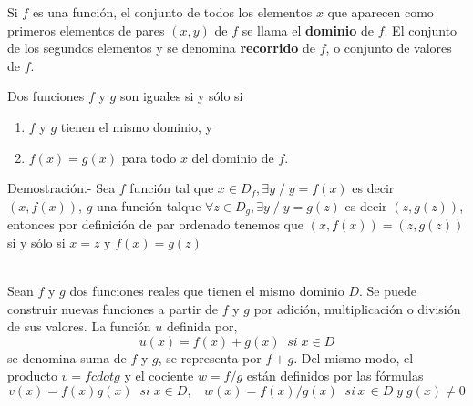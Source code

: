    \begin{tcolorbox}
        \begin{def.}
            Si $f$ es una función, el conjunto de todos los elementos $x$ que aparecen como primeros elementos de pares $(x,y)$ de $f$ se llama el \textbf{dominio} de $f$.  El conjunto de los segundos elementos y se denomina \textbf{recorrido} de $f$, o conjunto de valores de $f$.
        \end{def.}
    \end{tcolorbox}

        \begin{teo}
            Dos funciones $f$ y $g$ son iguales si y sólo si 
            \begin{enumerate}[\bfseries (a)]
                \item $f$ y $g$ tienen el mismo dominio, y
                \item $f(x) = g(x)$ para todo $x$ del dominio de $f.$\\
            \end{enumerate}
            Demostración.- \; Sea $f$ función tal que $x \in  D_f,\exists y \; / \; y=f(x)$ es decir $(x,f(x))$, $g$ una función talque $\forall  z \in  D_g , \exists  y \; / \; y=g(z)$ es decir $(z,g(z))$, entonces por definición de par ordenado tenemos que $(x,f(x)) = (z,g(z)) $ si y sólo si $x=z$ y $f(x)=g(z)$\\\\
        \end{teo}

    \begin{tcolorbox}
        \begin{def.}
            Sean $f$ y $g$ dos funciones reales que tienen el mismo dominio $D$. Se puede construir nuevas funciones a partir de $f$ y $g$ por adición, multiplicación o división de sus valores. La función $u$ definida por,
            $$u(x) = f(x) + g(x) \; \; si \; x \in D$$
            se denomina suma de $f$ y $g$, se representa por $f+g.$ Del mismo modo, el producto $v=f cdot g$ y el cociente $w=f/g$ están definidos por las fórmulas
            $$v(x) = f(x) g(x) \; \; si \; x \in D, \; \; \, \, w(x) = f(x)/g(x) \; \; si \, x \, \in D \; y \; g(x) \neq 0$$
        \end{def.}
    \end{tcolorbox}
    
